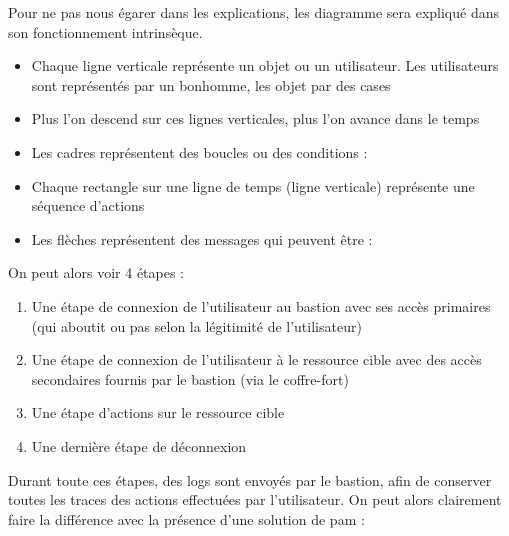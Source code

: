 Pour ne pas nous égarer dans les explications, les diagramme sera expliqué dans son fonctionnement intrinsèque.

\begin{itemize}
	\item Chaque ligne verticale représente un objet ou un utilisateur. Les utilisateurs sont représentés par un bonhomme, les objet par des cases
	\item Plus l'on descend sur ces lignes verticales, plus l'on avance dans le temps
	\item Les cadres représentent des boucles ou des conditions :
	\item Chaque rectangle sur une ligne de temps (ligne verticale) représente une séquence d'actions
	\item Les flèches représentent des messages qui peuvent être :
\end{itemize}

On peut alors voir 4 étapes :

\begin{enumerate}
	\item Une étape de connexion de l'utilisateur au \gls{bastion} avec ses accès primaires (qui aboutit ou pas selon la légitimité de l'utilisateur)
	\item Une étape de connexion de l'utilisateur à le ressource cible avec des accès secondaires fournis par le \gls{bastion} (via le coffre-fort)
	\item Une étape d'actions sur le ressource cible
	\item Une dernière étape de déconnexion
\end{enumerate}

Durant toute ces étapes, des logs sont envoyés par le \gls{bastion}, afin de conserver toutes les traces des actions effectuées par l'utilisateur. On peut alors clairement faire la différence avec la présence d'une solution de \gls{pam} :

